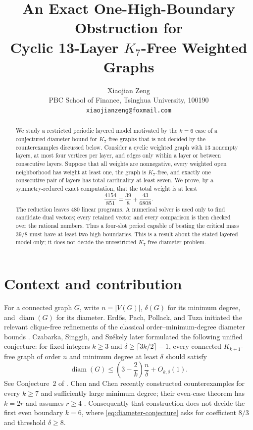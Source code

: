 \documentclass[11pt]{article}
\title{An Exact One-High-Boundary Obstruction for\\
       Cyclic 13-Layer $K_7$-Free Weighted Graphs}
\author{Xiaojian Zeng\\
\small PBC School of Finance, Tsinghua University, 100190\\
\small \texttt{xiaojianzeng@foxmail.com}}
\date{}
\theoremstyle{remark}
\begin{document}
\maketitle

\begin{abstract}
We study a restricted periodic layered model motivated by the $k=6$ case of a
conjectured diameter bound for $K_7$-free graphs that is not decided by the
counterexamples discussed below.  Consider a
cyclic weighted graph with 13 nonempty layers, at most four vertices per
layer, and edges only within a layer or between consecutive layers.  Suppose
that all weights are nonnegative, every weighted open neighborhood has weight
at least one, the graph is $K_7$-free, and exactly one consecutive pair of
layers has total cardinality at least seven.  We prove, by a symmetry-reduced
exact computation, that the total weight is at least
\[
   \frac{4154}{851}=\frac{39}{8}+\frac{43}{6808}.
\]
The reduction leaves 480 linear programs.  A numerical solver is used only to
find candidate dual vectors; every retained vector and every comparison is
then checked over the rational numbers.  Thus a four-slot period capable of
beating the critical mass $39/8$ must have at least two high boundaries.  This
is a result about the stated layered model only; it does not decide the
unrestricted $K_7$-free diameter problem.
\end{abstract}

\section{Context and contribution}

For a connected graph $G$, write $n=|V(G)|$, $\delta(G)$ for its minimum
degree, and $\operatorname{diam}(G)$ for its diameter.  Erd\H{o}s, Pach,
Pollack, and Tuza initiated the relevant clique-free refinements of the
classical order--minimum-degree diameter bounds
\cite{ErdosPachPollackTuza1989}.  Czabarka, Singgih, and Sz\'ekely later
formulated the following unified conjecture: for fixed integers $k\geq 3$ and
$\delta\geq \lceil 3k/2\rceil-1$, every connected $K_{k+1}$-free graph of
order $n$ and minimum degree at least $\delta$ should satisfy
\begin{equation}\label{eq:diameter-conjecture}
 \operatorname{diam}(G)
 \leq \left(3-\frac{2}{k}\right)\frac{n}{\delta}+O_{k,\delta}(1).
\end{equation}
See Conjecture~2 of \cite{CzabarkaSinggihSzekely2021}.  Chen and Chen recently
constructed counterexamples for every $k\geq7$ and sufficiently large minimum
degree; their even-case theorem has
$k=2r$ and assumes $r\geq4$ \cite{ChenChen2026}.  Consequently that
construction does not decide the first even boundary $k=6$, where
\eqref{eq:diameter-conjecture} asks for coefficient $8/3$ and threshold
$\delta\geq8$.
\end{document}
